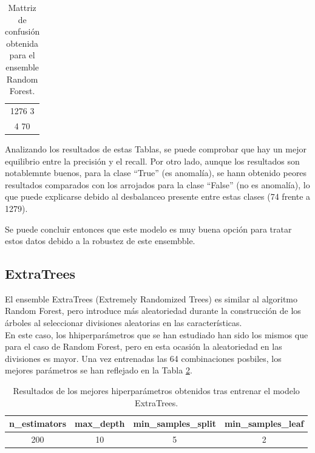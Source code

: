 \documentclass[12pt,letterpaper]{article}
\begin{document}
\begin{table}[H]
    \centering
    \begin{tabular}{|c|}
    \hline
    1276 \hspace{8mm} 3 \\
    4 \hspace{12mm} 70 \\ \hline
    \end{tabular}
    \caption{Mattriz de confusión obtenida para el ensemble Random Forest.}
    \label{tab:confusion-RF}
\end{table}

Analizando los resultados de estas Tablas, se puede comprobar que hay un mejor equilibrio entre la precisión y el recall. Por otro lado, aunque los resultados son notablemnte buenos, para la clase ``True'' (es anomalía), se hann obtenido peores resultados comparados con los arrojados para la clase ``False'' (no es anomalía), lo que puede explicarse debido al desbalanceo presente entre estas clases (74 frente a 1279).

Se puede concluir entonces que este modelo es muy buena opción para tratar estos datos debido a la robustez de este ensembble.

\subsection{ExtraTrees}
El ensemble ExtraTrees (Extremely Randomized Trees) es similar al algoritmo Random Forest, pero introduce más aleatoriedad durante la construcción de los árboles al seleccionar divisiones aleatorias en las características.\\
En  este caso, los hhiperparámetros que se han estudiado han sido los mismos que para el caso de Random Forest, pero en esta ocasión la aleatoriedad en las divisiones es mayor. Una vez entrenadas las 64 combinaciones posbiles, los mejores parámetros se han reflejado en la Tabla \ref{tab:hiper-ET}.
\begin{table}[H]
    \centering
    \begin{tabular}{|c|c|c|c|}
    \hline
    n\_estimators &  max\_depth & min\_samples\_split & min\_samples\_leaf \\ \hline
    200 & 10 & 5 & 2 \\ \hline
    \end{tabular}
    \caption{Resultados de los mejores hiperparámetros obtenidos tras entrenar el modelo ExtraTrees.}
    \label{tab:hiper-ET}
\end{table}
\end{document}
